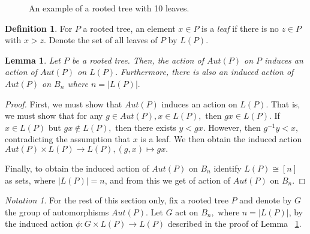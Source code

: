 \documentclass[10 pt]{amsart}
\theoremstyle{plain}
\newtheorem{lem}[thm]{Lemma}
\theoremstyle{definition}
\newtheorem{defn}[thm]{Definition}
\theoremstyle{remark}
\newtheorem{note}[thm]{Notation}
\numberwithin{equation}{section}
\begin{document}
\begin{figure}[h!]
\caption{\label{fig:tree2} An example of a rooted tree with 10  leaves.}
\end{figure}

\begin{defn}
For $P$ a rooted tree, an element $x \in P$ is a {\it leaf} if there is no $z \in P$ with $x > z.$ Denote the set of all leaves of $P$ by $L(P).$
\end{defn}

\begin{lem}
\label{lem:induced_tree_action}
Let $P$ be a rooted tree. Then, the action of $Aut(P)$ on $P$ induces an action of $Aut(P)$ on $L(P).$ Furthermore, there is also an induced action of $Aut(P)$ on $B_n$ where $n = |L(P)|.$ 
\end{lem}
\begin{proof}
First, we must show that $Aut(P)$ induces an action on $L(P).$ That is, we must show that for any $g \in Aut(P),x \in L(P),$ then $gx \in L(P).$ If $x \in L(P)$ but $gx \notin L(P),$ then there exists $y < gx.$ However, then $g^{-1}y < x,$ contradicting the assumption that $x$ is a leaf. We then obtain the induced action $Aut(P)\times L(P) \rightarrow L(P),(g,x)\mapsto gx.$

Finally, to obtain the induced action of $Aut(P)$ on $B_n$ identify $L(P) \cong [n]$ as sets, where $|L(P)| = n$, and from this we get of action of $Aut(P)$ on $B_n.$
\end{proof}

\begin{note}
For the rest of this section only, fix a rooted tree $P$ and denote by $G$ the group of automorphisms $Aut(P).$ Let $G$ act on $B_n,$ where $n = |L(P)|$, by the induced action $\phi:G \times L(P) \rightarrow L(P)$ described in the proof of Lemma ~\ref{lem:induced_tree_action}.
\end{note}
\end{document}
